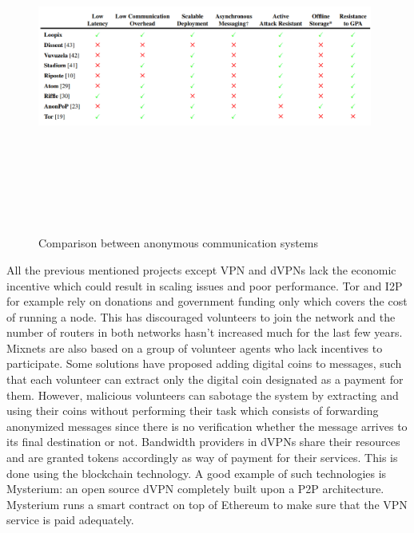 \begin{figure}[H]
    \centering
    \includegraphics[width=11cm,height=11cm,keepaspectratio]{../yellowpaper/images/state-of-the-art.png}
    \caption{Comparison between anonymous communication systems}
    \label{fig:Comparison between anonymous communication systems}
\end{figure}
\hspace{-5mm}All the previous mentioned projects except VPN and dVPNs lack the economic incentive which could result in scaling issues and poor performance. Tor and I2P for example rely on donations and government funding only which covers the cost of running a node. This has discouraged volunteers to join the network and the number of routers in both networks hasn't increased much for the last few years.  Mixnets are also based on a group of volunteer agents who lack incentives to participate. Some solutions have proposed adding digital coins to messages, such that each volunteer can extract only the digital coin designated as a payment for them. However, malicious volunteers can sabotage the system by extracting and using their coins without performing their task which consists of forwarding anonymized messages since there is no verification whether the message arrives to its final destination or not. Bandwidth providers in dVPNs share their resources and are granted tokens accordingly as way of payment for their services. This is done using the blockchain technology. A good example of such technologies is Mysterium: an open source dVPN completely built upon a P2P architecture. Mysterium runs a smart contract on top of Ethereum to make sure that the VPN service is paid adequately.

